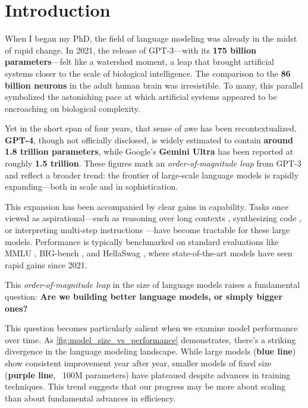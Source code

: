 \chapter{Introduction}

When I began my PhD, the field of language modeling was already in the midst of rapid change. In 2021, the release of GPT-3—with its \textbf{175 billion parameters}—felt like a watershed moment, a leap that brought artificial systems closer to the scale of biological intelligence. The comparison to the \textbf{86 billion neurons} in the adult human brain \citep{azevedo2009neurons} was irresistible. To many, this parallel symbolized the astonishing pace at which artificial systems appeared to be encroaching on biological complexity.

Yet in the short span of four years, that sense of awe has been recontextualized. \textbf{GPT-4}, though not officially disclosed, is widely estimated to contain \textbf{around 1.8 trillion parameters}, while Google's \textbf{Gemini Ultra} has been reported at roughly \textbf{1.5 trillion}. These figures mark an \emph{order-of-magnitude leap} from GPT-3 and reflect a broader trend: the frontier of large-scale language models is rapidly expanding—both in scale and in sophistication.

This expansion has been accompanied by clear gains in capability. Tasks once viewed as aspirational—such as reasoning over long contexts \citep{lewis2020retrieval}, synthesizing code \citep{chen2021evaluating}, or interpreting multi-step instructions \citep{wei2022chain}—have become tractable for these large models. Performance is typically benchmarked on standard evaluations like MMLU \citep{hendrycks2021mmlu}, BIG-bench \citep{srivastava2023bigbench}, and HellaSwag \citep{zellers2019hellaswag}, where state-of-the-art models have seen rapid gains since 2021.

This \emph{order-of-magnitude leap} in the size of language models raises a fundamental question: \textbf{Are we building better language models, or simply bigger ones?}

This question becomes particularly salient when we examine model performance over time. As \cref{fig:model_size_vs_performance} demonstrates, there's a striking divergence in the language modeling landscape. While large models (\textbf{\textcolor[HTML]{A0DDFF}{blue} line}) show consistent improvement year after year, smaller models of fixed size (\textbf{\textcolor[HTML]{C1CEFE}{purple} line}, ~100M parameters) have plateaued despite advances in training techniques. This trend suggests that our progress may be more about scaling than about fundamental advances in efficiency.

